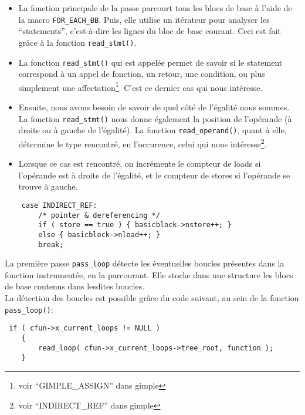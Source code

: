 \begin{itemize}

\item La fonction principale de la passe parcourt tous les blocs de base à l'aide de la macro \verb#FOR_EACH_BB#. Puis, elle utilise un itérateur pour analyser les ``statements'', c'est-à-dire les lignes du bloc de base courant. Ceci est fait grâce à la fonction \verb#read_stmt()#.\\

\item La fonction \verb#read_stmt()# qui est appelée permet de savoir si le statement correspond à un appel de fonction, un retour, une condition, ou plus simplement une affectation\footnote{voir ``GIMPLE\_ASSIGN'' dans gimple}. C'est ce dernier cas qui nous intéresse.\\

\item Ensuite, nous avons besoin de savoir de quel côté de l'égalité nous sommes. La fonction \verb#read_stmt()# nous donne également la position de l'opérande (à droite ou à gauche de l'égalité). La fonction \verb#read_operand()#, quant à elle, détermine le type rencontré, en l'occurence, celui qui nous intéresse\footnote{voir ``INDIRECT\_REF'' dans gimple}.\\

\item Lorsque ce cas est rencontré, on incrémente le compteur de loads si l'opérande est à droite de l'égalité, et le compteur de stores si l'opérande se trouve à gauche.\\

\end{itemize}

\begin{verbatim}
	case INDIRECT_REF:
	    /* pointer & dereferencing */
	    if ( store == true ) { basicblock->nstore++; }
	    else { basicblock->nload++; }
	    break;
\end{verbatim}

La première passe \verb#pass_loop# détecte les éventuelles boucles présentes dans la fonction instrumentée, en la parcourant. Elle stocke dans une structure les blocs de base contenus dans lesdites boucles.\\
La détection des boucles est possible grâce du code suivant, au sein de la fonction \verb#pass_loop()#:
\begin{verbatim}
 if ( cfun->x_current_loops != NULL )
	{
	    read_loop( cfun->x_current_loops->tree_root, function );
	}
\end{verbatim}

